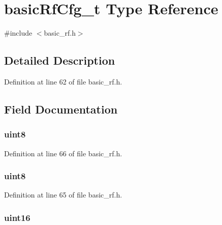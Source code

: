 \hypertarget{typebasic_rf_cfg__t}{
\section{basicRfCfg\_\-t Type Reference}
\label{typebasic_rf_cfg__t}
}


{\ttfamily \#include $<$basic\_\-rf.h$>$}

\par
\par


\subsection{Detailed Description}


Definition at line 62 of file basic\_\-rf.h.



\subsection{Field Documentation}
\hypertarget{typebasic_rf_cfg__t_ac6a824d3e662c8a11629d5179aacaa02}{
\subsubsection[{ackRequest}]{ {\bfseries uint8 } }}
\label{typebasic_rf_cfg__t_ac6a824d3e662c8a11629d5179aacaa02}


Definition at line 66 of file basic\_\-rf.h.

\hypertarget{typebasic_rf_cfg__t_a94e9cfdc116e8607615a5e8529048b1e}{
\subsubsection[{channel}]{ {\bfseries uint8 } }}
\label{typebasic_rf_cfg__t_a94e9cfdc116e8607615a5e8529048b1e}


Definition at line 65 of file basic\_\-rf.h.

\hypertarget{typebasic_rf_cfg__t_a56c8812590b394c1ee09a67aa3ad79e2}{
\subsubsection[{myAddr}]{ {\bfseries uint16 } }}
\label{typebasic_rf_cfg__t_a56c8812590b394c1ee09a67aa3ad79e2}


